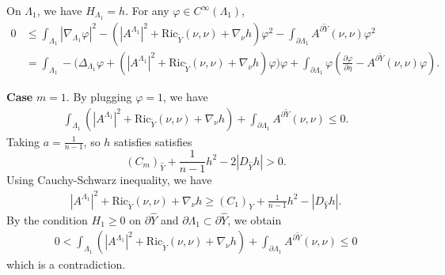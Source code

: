 \documentclass[11pt,letterpaper]{amsart}
\theoremstyle{definition}
\theoremstyle{remark}
\numberwithin{equation}{section}
\begin{document}
On $\Lambda_{1}$, we have $H_{\Lambda_{1}}=h$. For any $\varphi\in C^\infty(\Lambda_{1})$,
    \begin{align*}
    0&\leq \int_{\Lambda_{1}} |\nabla_{\Lambda_{1}}\varphi|^2-(|A^{\Lambda_{1}}|^2+\text{Ric}_{\tilde{Y}}(\nu,\nu)+\nabla_\nu h)\varphi^2-\int_{\partial\Lambda_{1}}A^{\partial \tilde{Y}}(\nu,\nu)\varphi^2\\
    &=\int_{\Lambda_{1}} -\big(\Delta_{\Lambda_{1}}\varphi+(|A^{\Lambda_{1}}|^2+\text{Ric}_{\tilde{Y}}(\nu,\nu)+\nabla_\nu h)\varphi\big)\varphi+\int_{\partial\Lambda_{1}}\varphi(\frac{\partial \varphi}{\partial \eta}-A^{\partial \tilde{Y}}(\nu,\nu)\varphi).
    \end{align*}
    
    \textbf{Case} $m=1$. By plugging $\varphi=1$, we have
    \[
    \begin{aligned}
       \int_{\Lambda_{1}}(|A^{\Lambda_{1}}|^2+\text{Ric}_{\tilde{Y}}(\nu,\nu)+\nabla_\nu h)+\int_{\partial\Lambda_{1}}A^{\partial \tilde{Y}}(\nu,\nu) \leq 0.
    \end{aligned}
    \]
    Taking $a=\frac{1}{n-1}$, so $h$ satisfies satisfies
    \[
    (C_{m})_{\hat{Y}}+\frac{1}{n-1} h^2-2|D_{\hat{Y}}h|>0.
    \]
    Using Cauchy-Schwarz inequality, we have 
    \[
    \begin{aligned}
        |A^{\Lambda_{1}}|^2+\text{Ric}_{\tilde{Y}}(\nu,\nu)+\nabla_\nu h\geq (C_{1})_{\hat{Y}}+\frac{1}{n-1} h^2-|D_{\hat{Y}}h|.
    \end{aligned}
    \]
    By the condition $H_{1}\geq 0$ on $\partial \hat{Y}$ and $\partial \Lambda_{1}\subset \partial \hat{Y}$, we obtain
    \[
    \begin{aligned}
       0<\int_{\Lambda_{1}}(|A^{\Lambda_{1}}|^2+\text{Ric}_{\tilde{Y}}(\nu,\nu)+\nabla_\nu h)+\int_{\partial\Lambda_{1}}A^{\partial \tilde{Y}}(\nu,\nu) \leq 0
    \end{aligned}
    \]
    which is a contradiction.
    
\end{document}
